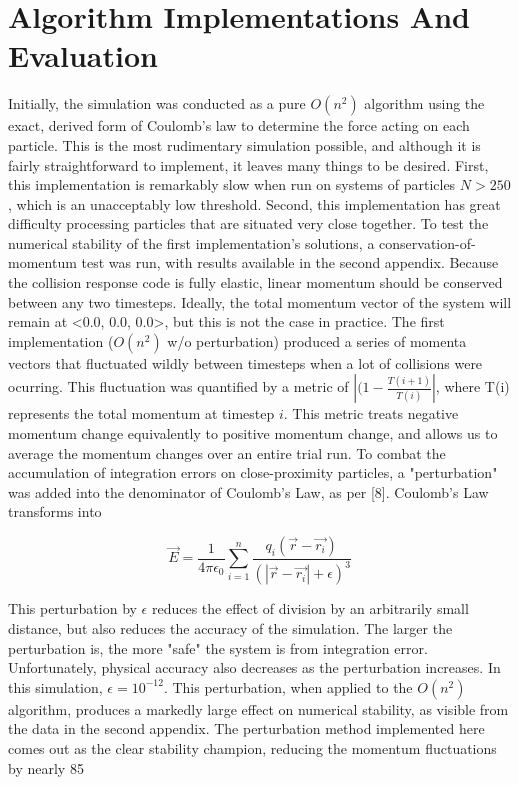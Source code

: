 \documentclass[10pt]{article}
\begin{document}
\section{Algorithm Implementations And Evaluation}
Initially, the simulation was conducted as a pure $O(n^2)$ algorithm using the exact, derived form of Coulomb's law to determine the force acting on each particle. This is the most rudimentary simulation possible, and although it is fairly straightforward to implement, it leaves many things to be desired. First, this implementation is remarkably slow when run on systems of particles $N > 250$, which is an unacceptably low threshold. Second, this implementation has great difficulty processing particles that are situated very close together. To test the numerical stability of the first implementation's solutions, a conservation-of-momentum test was run, with results available in the second appendix. Because the collision response code is fully elastic, linear momentum should be conserved between any two timesteps. Ideally, the total momentum vector of the system will remain at <0.0, 0.0, 0.0>, but this is not the case in practice. The first implementation ($O(n^2)$ w/o perturbation) produced a series of momenta vectors that fluctuated wildly between timesteps when a lot of collisions were ocurring. This fluctuation was quantified by a metric of $|(1 - \frac{T(i+1)}{T(i)}|$, where T(i) represents the total momentum at timestep $i$. This metric treats negative momentum change equivalently to positive momentum change, and allows us to average the momentum changes over an entire trial run. To combat the accumulation of integration errors on close-proximity particles, a "perturbation" was added into the denominator of Coulomb's Law, as per [8]. Coulomb's Law transforms into

$$\vec{E} = \frac{1}{4\pi\epsilon_0}\sum_{i = 1}^n \frac{q_i (\vec{r} - \vec{r_i})}{(|\vec{r} - \vec{r_i}| + \epsilon)^3}$$ 

This perturbation by $\epsilon$ reduces the effect of division by an arbitrarily small distance, but also reduces the accuracy of the simulation. The larger the perturbation is, the more "safe" the system is from integration error. Unfortunately, physical accuracy also decreases as the perturbation increases. In this simulation, $\epsilon = 10^{-12}$. This perturbation, when applied to the $O(n^2)$ algorithm, produces a markedly large effect on numerical stability, as visible from the data in the second appendix. The perturbation method implemented here comes out as the clear stability champion, reducing the momentum fluctuations by nearly 85%
\end{document}
